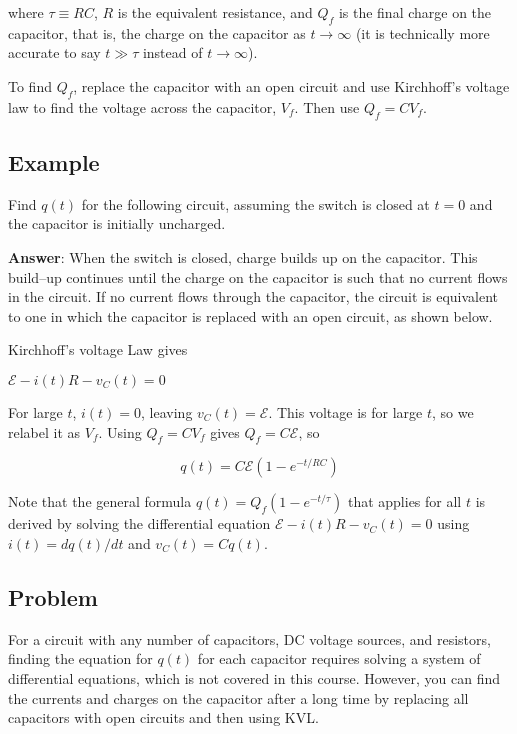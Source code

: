 \documentclass{article}
\begin{document}
where $\tau\equiv RC$, $R$ is the equivalent resistance, and $Q_f$ is the final charge on the capacitor, that is, the charge on the capacitor as $t\rightarrow\infty$ (it is technically more accurate to say $t\gg \tau$ instead of $t\rightarrow\infty$).

To find $Q_f$, replace the capacitor with an open circuit and use Kirchhoff's voltage law to find the voltage across the capacitor, $V_f$. Then use $Q_f=CV_f$.

\subsection{Example}

Find $q(t)$ for the following circuit, assuming the switch is closed at $t=0$ and the capacitor is initially uncharged.



\textbf{Answer}: When the switch is closed, charge builds up on the capacitor. This build--up continues until the charge on the capacitor is such that no current flows in the circuit. If no current flows through the capacitor, the circuit is equivalent to one in which the capacitor is replaced with an open circuit, as shown below. 



Kirchhoff's voltage Law gives

$\mathcal{E}-i(t)R-v_C(t)=0$

For large $t$, $i(t)=0$, leaving $v_{C}(t)=\mathcal{E}$. This voltage is for large $t$, so we relabel it as $V_f$. Using $Q_f=CV_f$ gives $Q_f=C\mathcal{E}$, so

\begin{equation}
q(t)=C\mathcal{E}(1-e^{-t/RC})
\end{equation}

Note that the general formula $q(t)=Q_f(1-e^{-t/\tau})$ that applies for all $t$ is derived by solving the differential equation $\mathcal{E}-i(t)R-v_C(t)=0$ using $i(t)=dq(t)/dt$ and $v_C(t)=Cq(t)$.

\ifsolutions

\else

\newpage
\fi
\ifsolutions\else
\newpage
\fi

\subsection{Problem}

For a circuit with any number of capacitors, DC voltage sources, and resistors, finding the equation for $q(t)$ for each capacitor requires solving a system of differential equations, which is not covered in this course. However, you can find the currents and charges on the capacitor after a long time by replacing all capacitors with open circuits and then using KVL.
\end{document}
